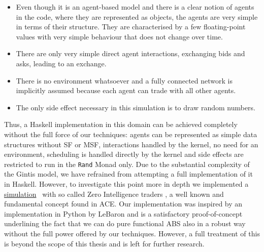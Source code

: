 \begin{itemize}
	\item Even though it is an agent-based model and there is a clear notion of agents in the code, where they are represented as objects, the agents are very simple in terms of their structure. They are characterised by a few floating-point values with very simple behaviour that does not change over time.

	\item There are only very simple direct agent interactions, exchanging bids and asks, leading to an exchange.

	\item There is no environment whatsoever and a fully connected network is implicitly assumed because each agent can trade with all other agents.
	
	\item The only side effect necessary in this simulation is to draw random numbers.
\end{itemize}

Thus, a Haskell implementation in this domain can be achieved completely without the full force of our techniques: agents can be represented as simple data structures without SF or MSF, interactions handled by the kernel, no need for an environment, scheduling is handled directly by the kernel and side effects are restricted to run in the \texttt{Rand} Monad only. Due to the substantial complexity of the Gintis model, we have refrained from attempting a full implementation of it in Haskell. However, to investigate this point more in depth we implemented a \href{https://github.com/thalerjonathan/zerointelligence}{simulation}~\cite{thaler_zerointelligence_repository} with so called Zero Intelligence traders \cite{gode_allocative_1993}, a well known and fundamental concept found in ACE. Our implementation was inspired by an implementation in Python by LeBaron \cite{lebaron_zerointelligence} and is a satisfactory proof-of-concept underlining the fact that we can do pure functional ABS also in a robust way without the full power offered by our techniques. However, a full treatment of this is beyond the scope of this thesis and is left for further research.


